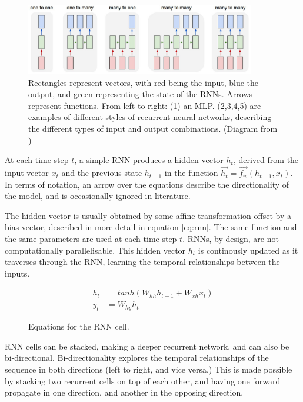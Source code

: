 \documentclass[12pt,twoside]{report}
\begin{document}
\begin{figure}[!ht]
	\centering
	\includegraphics[width=100mm]{diagrams/rnn.jpeg}
	\caption{Rectangles represent vectors, with red being the input, blue the output, and green representing the state of the RNNs. Arrows represent  functions. From left to right: (1) an MLP. (2,3,4,5) are examples of different styles of recurrent neural networks, describing the different types of input and output combinations. (Diagram from \cite{karpathy_unreasonable_2015}) \label{rnn}} 
\end{figure}

At each time step $t$, a simple RNN produces a hidden vector $h_t$, derived from the input vector $x_t$ and the previous state $h_{t-1}$ in the function $\overrightarrow{h_t} = \overrightarrow{f_w}(h_{t-1}, x_t)$. In terms of notation, an arrow over the equations describe the directionality of the model, and is occasionally ignored in literature.

The hidden vector is usually obtained by some affine transformation offset by a bias vector, described in more detail in equation \ref{eq:rnn}. The same function and the same parameters are used at each time step $t$. RNNs, by design, are not computationally parallelisable. This hidden vector $h_t$ is continously updated as it traverses through the RNN, learning the temporal relationships between the inputs.

\begin{figure}[!ht]
\begin{equation}
\label{eq:rnn}
\begin{aligned}
	h_t &= tanh(W_{hh}h_{t-1}+W_{xh}x_t)
\\
y_t &= W_{hy}h_t
\end{aligned}
\end{equation}
\captionsetup{labelformat=empty}
\caption{Equations for the RNN cell.}
\end{figure}

RNN cells can be stacked, making a deeper recurrent network, and can also be bi-directional. Bi-directionality explores the temporal relationships of the sequence in both directions (left to right, and vice versa.) This is made possible by stacking two recurrent cells on top of each other, and having one forward propagate in one direction, and another in the opposing direction.
\end{document}
